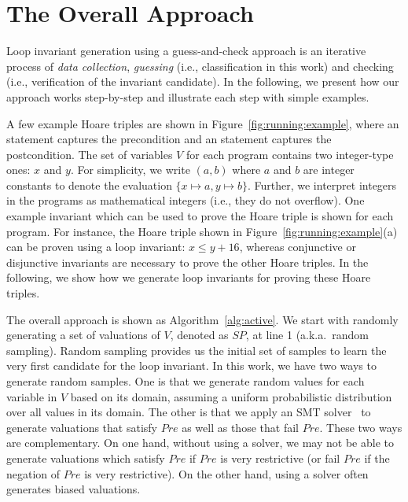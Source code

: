 \section{The Overall Approach}
\label{sec:overview}
Loop invariant generation using a guess-and-check approach is an iterative process of \emph{data collection}, \emph{guessing} (i.e., classification in this work) and checking (i.e., verification of the invariant candidate).
In the following, we present how our approach works step-by-step and illustrate each step with simple examples.

\begin{example}
A few example Hoare triples are shown in Figure~\ref{fig:running:example}, where an  statement captures the precondition and an  statement captures the postcondition.
The set of variables $V$ for each program contains two integer-type ones: $x$ and $y$. For simplicity, we write $(a, b)$ where $a$ and $b$ are integer constants to denote the  evaluation $\{x \mapsto a, y \mapsto b\}$. Further, we interpret integers in the programs as mathematical integers (i.e., they do not overflow).
One example invariant which can be used to prove the Hoare triple is shown for each program. For instance, the Hoare triple shown in Figure~\ref{fig:running:example}(a) can be proven using a loop invariant: $x \le y + 16$, whereas conjunctive or disjunctive invariants are necessary to prove the other Hoare triples. In the following, we show how we generate loop invariants for proving these Hoare triples.
\end{example}
\noindent The overall approach is shown as Algorithm~\ref{alg:active}. We start with randomly generating a set of valuations of $V$, denoted as $SP$, at line 1 (a.k.a.~random sampling). Random sampling provides us the initial set of samples to learn the very first candidate for the loop invariant.
In this work, we have two ways to generate random samples. One is that we generate random values for each variable in $V$ based on its domain,
assuming a uniform probabilistic distribution over all values in its domain.
The other is that we apply an SMT solver~\cite{barrett2009satisfiability,de2008z3} to generate valuations that satisfy $Pre$
as well as those that fail $Pre$. These two ways are complementary.
On one hand, without using a solver, we may not be able to generate valuations which satisfy $Pre$ if $Pre$ is very restrictive
(or fail $Pre$ if the negation of $Pre$ is very restrictive). On the other hand, using a solver often generates biased valuations. %

